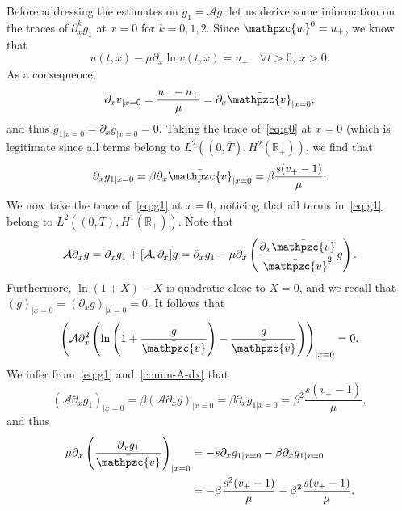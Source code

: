 \documentclass[AHL,Unicode,longabstracts,published]{cedram}
\newcommand{\R}{\mathbb{R}}
\newcommand{\p}{\partial}
\newcommand{\bv}{\bar{\mathpzc{v}}}
\newcommand{\cA}{\mathcal A}
\newcommand{\tw}{\mathpzc{w}}
\let\oldforall\forall
\renewcommand*{\forall}{\mathrel{\oldforall}}
\begin{document}
Before addressing the estimates on $g_1=\cA g$, let us derive some information on the traces of $\p_x^k g_1$ at $x=0$ for $k=0,1, 2$. Since $\tw^0=u_+$, we know that
\[
u(t,x)- \mu \p_x \ln v(t,x)=u_+\quad \forall t>0, \ x>0.
\]
As a consequence,
\[
\p_x v_{|x=0}= \frac{u_--u_+}{\mu}=\p_x \bv_{|x=0},
\]
and thus $g_{1|x=0}=\p_x g_{|x=0}=0$. Taking the trace of~\eqref{eq:g0} at $x=0$ (which is legitimate since all terms belong to $L^2((0, \overline{T}), H^2(\R_+))$, we find that
\begin{equation}\label{trace-dx-g1}
\p_x g_{1|x=0}= \beta \p_x \bv_{|x=0}= \beta \frac{s(v_+-1)}{\mu}.
\end{equation}
We now take the trace of~\eqref{eq:g1} at $x=0$, noticing that all terms in~\eqref{eq:g1} belong to $L^2((0,T), H^1(\R_+))$. Note that
\begin{equation}\label{comm-A-dx}
\cA\p_x g= \p_x g_1 + [\cA, \p_x] g= \p_x g_1 - \mu \p_x \left(\frac{\p_x \bv}{\bv^2} g\right).
\end{equation}
Furthermore, $\ln (1+X)-X$ is quadratic close to $X=0$, and we recall that $(g)_{|x=0} = (\p_x g)_{|x=0}=0$. It follows that
\[
\left(\cA \p_x^2\left(\ln\left(1+ \frac{g}{\bv}\right) - \frac{g}{\bv}\right)\right)_{|x=0}=0.
\]
We infer from~\eqref{eq:g1} and~\eqref{comm-A-dx} that
\[
\left(\cA \p_x g_1\right)_{|x=0} = \beta \left(\cA \partial_x g\right)_{|x=0} = \beta \p_x g_{1|x=0}= \beta^2 \frac{s(v_+-1)}{\mu},
\]
and thus
\begin{align}
\mu \p_x \left(\frac{\p_x g_1}{\bv}\right)_{|x=0} &=- s \p_x g_{1|x=0} - \beta \p_x g_{1|x=0} \label{bc:p2xg1-0}
\\
&=- \beta \frac{s^2(v_+-1)}{\mu} - \beta^2\frac{s(v_+-1)}{\mu}.
\label{eq:px_g1_0}
\end{align}
\end{document}
